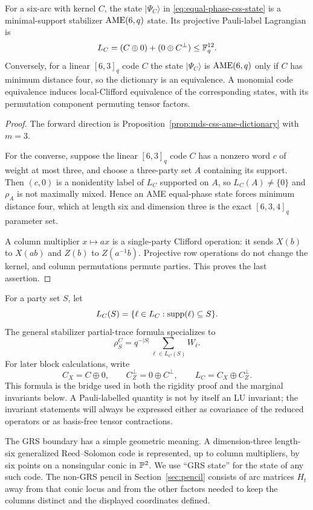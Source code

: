\begin{proposition}\label{thm:dictionary}
For a six-arc with kernel \(C\), the state \(\lvert\Psi_C\rangle\) in
\eqref{eq:equal-phase-css-state} is a minimal-support stabilizer
\(\mathrm{AME}(6,q)\) state.  Its
projective Pauli-label Lagrangian is
\[
 L_C=(C\oplus0)+(0\oplus C^\perp)\leq\mathbb F_q^{12}.
\]
Conversely, for a linear \([6,3]_q\) code \(C\) the state
\(\lvert\Psi_C\rangle\) is \(\mathrm{AME}(6,q)\) only if \(C\) has minimum distance
four, so the dictionary is an equivalence.  A monomial code equivalence
induces local-Clifford equivalence of the corresponding states, with its
permutation component permuting tensor factors.
\end{proposition}

\begin{proof}
The forward direction is Proposition~\ref{prop:mds-css-ame-dictionary} with
\(m=3\).

For the converse, suppose the linear \([6,3]_q\) code \(C\) has a nonzero word
\(c\) of weight at most three, and choose a three-party set \(A\) containing
its support.  Then \((c,0)\) is a nonidentity label of \(L_C\) supported on
\(A\), so \(L_C(A)\neq\{0\}\) and \(\rho_A\) is not maximally mixed.  Hence an
AME equal-phase state forces minimum distance four, which at length six and
dimension three is the exact \([6,3,4]_q\) parameter set.

A column multiplier \(x\mapsto ax\) is a single-party Clifford operation:
it sends \(X(b)\) to \(X(ab)\) and \(Z(b)\) to \(Z(a^{-1}b)\).
Projective row operations do not change the kernel, and column
permutations permute parties.  This proves the last assertion.
\end{proof}

For a party set \(S\), let
\[
 L_C(S)=\{\ell\in L_C:\operatorname{supp}(\ell)\subseteq S\}.
\]
The general stabilizer partial-trace formula specializes to
\begin{equation}\label{eq:css-reduced-state}
 \rho^C_S=q^{-|S|}\sum_{\ell\in L_C(S)}W_\ell .
\end{equation}
For later block calculations, write
\[
 C_X=C\oplus0,\qquad C^\perp_Z=0\oplus C^\perp,
 \qquad L_C=C_X\oplus C^\perp_Z .
\]
This formula is the bridge used in both the rigidity proof and the
marginal invariants below.  A Pauli-labelled quantity is not by itself an
LU invariant; the invariant statements will always be expressed either
as covariance of the reduced operators or as basis-free tensor
contractions.

The GRS boundary has a simple geometric meaning.  A dimension-three
length-six generalized Reed--Solomon code is represented, up to column
multipliers, by six points on a nonsingular conic in \(\mathbb P^2\).  We use
``GRS state'' for the state of any such code.  The non-GRS pencil in
Section~\ref{sec:pencil} consists of arc matrices \(H_t\) away from that
conic locus and from the other factors needed to keep the columns
distinct and the displayed coordinates defined.
